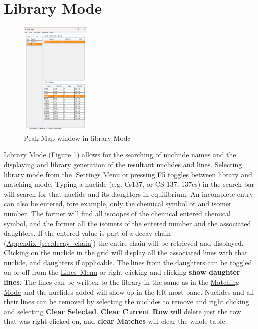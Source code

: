 \documentclass[12pt,report,justified]{SANDreport}
\begin{document}
\section{Library Mode}\label{sec:libMode}
\begin{figure}[h]
    \includegraphics[width=0.3\textwidth]{LibraryMode.png}
    \centering
    \caption{Peak Map window in library Mode}
   \label{fig:lib_mode}
\end{figure}
Library Mode (\hyperref[sec:fig:lib_mode]{Figure \ref{fig:lib_mode}})
allows for the searching of nucluide names and the displaying and library generation of the resultant nuclides and
lines. Selecting library mode from the \hyperref[sec:set_menu]]{Settings Menu} or pressing F5 toggles between library
and matching mode. Typing a nuclide (e.g. Cs137, or CS-137, 137cs) in the search bar will search for that nuclide
and its daughters in equilibrium. An incomplete entry can also be entered, fore example, only the chemical symbol
or and isomer number. The former will find all isotopes of the chemical entered chemical symbol, and the former
all the isomers of the entered number and the associated daughters. If the entered value is part of a decay chain
(\hyperref[sec:decay_chain]{Appendix~\ref{sec:decay_chain}}) the entire chain will be
retrieved and displayed. Clicking on the nuclide in the grid will display all the associated lines with that nuclide,
and daughters if applicable. The lines from the daughters can be toggled on or off from the
\hyperref[sec:line_menu]{Lines~Menu} or right clicking and clicking \textbf{show daughter lines}. The lines can be
written to the library in the same as in the \hyperref[sec:match_mode]{Matching Mode} and the nuclides added will
show up in the left most pane. Nuclides and all their lines can be removed by selecting the nuclides to remove and
right clicking and selecting \textbf{Clear Selected}. \textbf{Clear Current Row} will delete just the row that was
right-clicked on, and \textbf{clear Matches} will clear the whole table.
\end{document}

